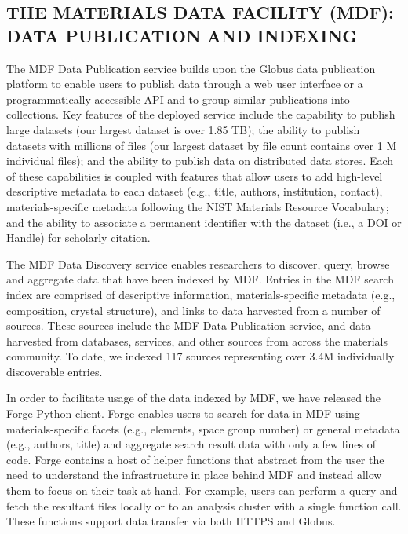 \documentclass{aip-cp}
\newcommand\ben[1]{}
\newcommand\ryan[1]{}
\newcommand\ben[1]{{\color{blue}[Ben: #1]}}
\newcommand\ryan[1]{{\color{green}[Ryan: #1]}}
\begin{document}



\subsection{THE MATERIALS DATA FACILITY (MDF): DATA PUBLICATION AND INDEXING}
\ben{Add MDF overview text and text linking this to the other sections}

The MDF Data Publication service builds upon the Globus data
publication platform to enable
users to publish data through a web user interface or a
programmatically accessible API and to group similar publications into
collections. Key features of the deployed service include the capability to
publish large datasets (our largest dataset is over 1.85 TB); the ability to
publish datasets with millions of files (our largest dataset by file count
contains over 1 M individual files); and the ability to publish data on
distributed data stores. Each of these capabilities is coupled with
features that allow users to add high-level descriptive metadata to each dataset
(e.g., title, authors, institution, contact), materials-specific metadata
following the NIST Materials Resource Vocabulary; and the ability to associate
a permanent identifier with the dataset (i.e., a DOI or Handle) for scholarly
citation.

The MDF Data Discovery service enables
researchers to discover, query, browse and aggregate data that have been
indexed by MDF. Entries in the MDF search index are comprised of descriptive
information, materials-specific metadata (e.g., composition, crystal
structure), and links to data harvested from a number of sources. These
sources include the MDF Data Publication service, and
data harvested from databases, services, and other sources from across the
materials community. To date, we indexed 117 sources representing over 3.4M
individually discoverable entries.

In order to facilitate usage of the data indexed by MDF, we have released the
Forge Python client. Forge enables users to search for data in MDF using
materials-specific facets (e.g., elements, space group number) or general
metadata (e.g., authors, title) and aggregate search result data with only a
few lines of code. Forge contains a host of helper functions that
abstract from the user the need to understand the infrastructure in place
behind MDF and instead allow them to focus on their task at hand. For example,
users can perform a query and fetch the resultant files locally or to an
analysis cluster with a single function call. These functions support data
transfer via both HTTPS and Globus.
\end{document}

